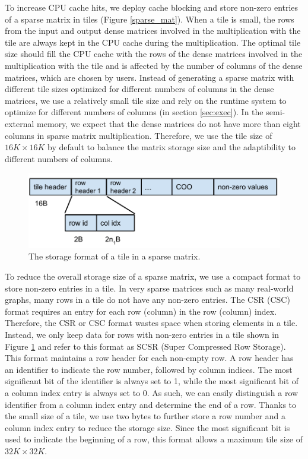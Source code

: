 To increase CPU cache hits, we deploy cache blocking \cite{Im04} and store
non-zero entries of a sparse matrix in tiles (Figure \ref{sparse_mat}).
When a tile is small, the rows from the input and output dense matrices
involved in the multiplication with the tile are always kept in the CPU cache
during the multiplication. The optimal tile size should fill the CPU cache
with the rows of the dense matrices involved in the multiplication with
the tile and is affected by the number of columns of the dense matrices,
which are chosen by users. Instead of generating a sparse matrix with
different tile sizes optimized for different numbers of columns in the dense
matrices, we use a relatively small tile size and rely on the runtime system
to optimize for different numbers of columns (in section \ref{sec:exec}).
In the semi-external memory, we expect that the dense matrices do not
have more than eight columns in sparse matrix multiplication. Therefore, we
use the tile size of $16K \times 16K$ by default to balance the matrix storage
size and the adaptibility to different numbers of columns.

\begin{figure}
\centering
\includegraphics[scale=0.5]{./tile_format.pdf}
\vspace{-5pt}
\caption{The storage format of a tile in a sparse matrix.}
\vspace{-5pt}
\label{tile_format}
\end{figure}

To reduce the overall storage size of a sparse matrix, we use a compact format
to store non-zero entries in a tile. In very sparse matrices such as
many real-world graphs, many rows in a tile do not have any non-zero entries.
The CSR (CSC) format requires an entry for each row (column) in the row
(column) index. Therefore, the CSR or CSC format wastes space when storing elements
in a tile. Instead, we only keep data for rows with non-zero entries in a tile
shown in Figure \ref{tile_format} and refer to this format as SCSR (Super
Compressed Row Storage). This format maintains a row header for each non-empty
row. A row header has an identifier to indicate the row number, followed by
column indices. 
The most significant bit of the identifier is always set to 1, while the most
significant bit of a column index entry is always set to 0. As such, we can easily
distinguish a row identifier from a column index entry and determine the end
of a row. Thanks to the small size of a tile, we use two bytes to further store a row
number and a column index entry to reduce the storage size. Since the most
significant bit is used to indicate the beginning of a row, this format allows
a maximum tile size of $32K \times 32K$.

